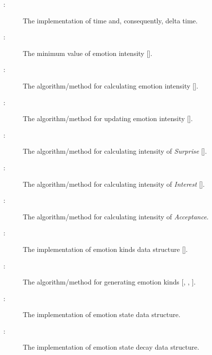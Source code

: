 \begin{description}

    \item[ \actheacnum \label{acTimeImpl}:] The
    implementation of time and, consequently, delta time.

    \item[ \actheacnum \label{acEmotionIntensityMin}:]
    The minimum value of emotion intensity [].

    \item[ \actheacnum \label{acIntensityAlgo}:] The
    algorithm/method for calculating emotion intensity
    [].

    \item[ \actheacnum \label{acUpdateIntensityAlgo}:]
    The algorithm/method for updating emotion intensity 
    [].

    \item[ \actheacnum \label{acElicitSurpriseAlgo}:]
    The algorithm/method for calculating intensity of \textit{Surprise}
    [].

    \item[ \actheacnum \label{acElicitInterestAlgo}:]
    The algorithm/method for calculating intensity of \textit{Interest}
    [].

    \item[ \actheacnum \label{acElicitAcceptanceAlgo}:]
    The algorithm/method for calculating intensity of \textit{Acceptance}.

    \item[ \actheacnum \label{acEmotionKindType}:] The
    implementation of emotion kinds data structure [].

    \item[ \actheacnum \label{acAppraisalAlgo}:] The
    algorithm/method for generating emotion kinds [,
    , ].

    \item[ \actheacnum \label{acEmotionStateImpl}:] The
    implementation of emotion state data structure.

    \item[ \actheacnum \label{acEmotionDecayStateImpl}:]
    The implementation of emotion state decay data structure.


\end{description}
